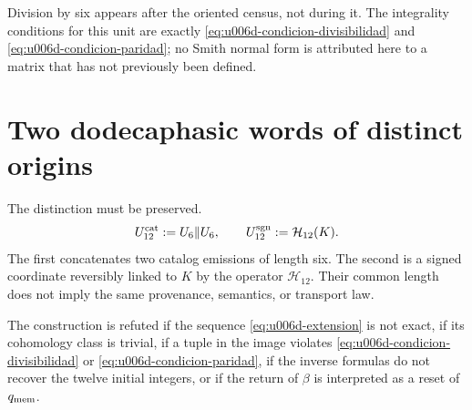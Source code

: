Division by six appears after the oriented census, not during it. The
integrality conditions for this unit are exactly
\eqref{eq:u006d-condicion-divisibilidad} and
\eqref{eq:u006d-condicion-paridad}; no Smith normal form is attributed here to a
matrix that has not previously been defined.

\section{Two dodecaphasic words of distinct origins}

The distinction must be preserved.
\begin{equation}
 U_{12}^{\rm cat}:=U_6\Vert U_6,
 \qquad
 U_{12}^{\rm sgn}:=\mathcal H_{12}(K).
 \label{eq:u006d-dos-palabras-doce}
\end{equation}
The first concatenates two catalog emissions of length six. The second
is a signed coordinate reversibly linked to \(K\) by the operator
\(\mathcal H_{12}\). Their common length does not imply the same provenance,
semantics, or transport law.

\begin{criterion}
\label{crit:u006d-refutacion}
The construction is refuted if the sequence
\eqref{eq:u006d-extension} is not exact, if its cohomology class is
trivial, if a tuple in the image violates
\eqref{eq:u006d-condicion-divisibilidad} or
\eqref{eq:u006d-condicion-paridad}, if the inverse formulas do not recover
the twelve initial integers, or if the return of \(\beta\) is interpreted as a
reset of \(q_{\rm mem}\).
\end{criterion}
